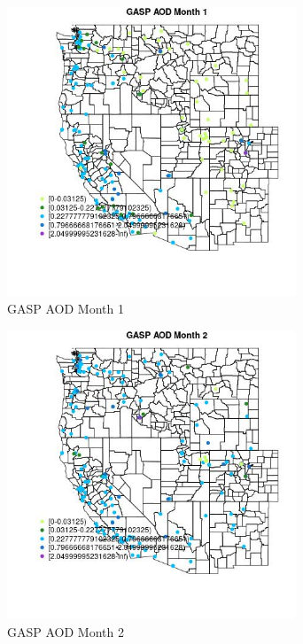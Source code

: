 \begin{figure} 
\centering  
\includegraphics[width=0.77\textwidth]{Code_Outputs/Report_ML_input_PM25_Step4_part_e_de_duplicated_aveswNAs_MapObsMo1GASP_AOD.jpg} 
\caption{\label{fig:Report_ML_input_PM25_Step4_part_e_de_duplicated_aveswNAsMapObsMo1GASP_AOD}GASP AOD Month 1} 
\end{figure} 
 

\begin{figure} 
\centering  
\includegraphics[width=0.77\textwidth]{Code_Outputs/Report_ML_input_PM25_Step4_part_e_de_duplicated_aveswNAs_MapObsMo2GASP_AOD.jpg} 
\caption{\label{fig:Report_ML_input_PM25_Step4_part_e_de_duplicated_aveswNAsMapObsMo2GASP_AOD}GASP AOD Month 2} 
\end{figure} 
 

